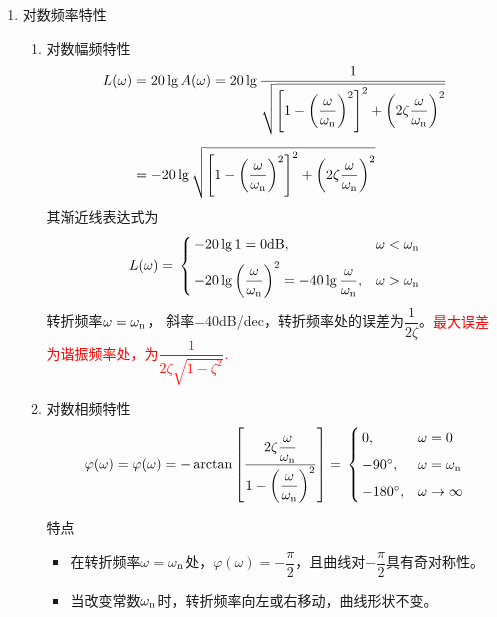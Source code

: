 \begin{enumerate}[1.]
\begin{enumerate}[(1) ]
	\end{enumerate}
	\item 对数频率特性
	\begin{enumerate}[(1) ]
		\item 对数幅频特性
		\vspace*{-0.5em}
		\begin{equation}
			\begin{split}
				L(\omega) & = 20\lg A(\omega) = 20 \lg \dfrac{1}{\sqrt{\left[1 - \left(\dfrac{\omega}{\omega_{\rm{n}}}\right)^2\right]^2 + \left(2 \zeta \dfrac{\omega}{\omega_{\rm{n}}}\right)^2}}\\[0.5em]
				& = -20 \lg \sqrt{\left[1 - \left(\dfrac{\omega}{\omega_{\rm{n}}}\right)^2\right]^2 + \left(2 \zeta \dfrac{\omega}{\omega_{\rm{n}}}\right)^2}
			\end{split}
		\end{equation}
		其渐近线表达式为
		\begin{align}
			L(\omega) = \,
			\begin{cases}
				\, -20 \lg 1 = 0 \text{dB}, & \omega < \omega_{\rm{n}}\\[0.5em]
				\, -20 \lg \left(\dfrac{\omega}{\omega_{\rm{n}}}\right)^2= - 40 \lg \dfrac{\omega}{\omega_{\rm{n}}}, & \omega > \omega_{\rm{n}}
			\end{cases}
		\end{align}
		转折频率$\omega = \omega_{\rm{n}}$， 斜率$-$40dB/dec，转折频率处的误差为$\dfrac{1}{2 \zeta }$。\textcolor{red}{最大误差为谐振频率处，为$ \dfrac{1}{2 \zeta \sqrt{1-\zeta^2}}$.}
		\item 对数相频特性
		\vspace*{-0.5em}
		\begin{align}
			\varphi(\omega) = \varphi(\omega) = -\arctan \left[\dfrac{2 \zeta \dfrac{\omega}{\omega_{\rm{n}}}}{1 - \left(\dfrac{\omega}{\omega_{\rm{n}}}\right)^2}\right] = \,
			\begin{cases}
				\, 0, & \omega = 0\\[0.5em]
				\, -90{}^{\circ} , & \omega = \omega_{\rm{n}}\\[0.5em]
				\, -180 {}^{\circ}, & \omega \to \infty
			\end{cases}
		\end{align}
		\vspace*{-3em}
		
		特点
		\begin{itemize}
			\item 在转折频率$\omega = \omega_{\rm{n}}$处，$\varphi(\omega) =  -\dfrac{\pi}{2}$，且曲线对$-\dfrac{\pi}{2}$具有奇对称性。
			\item 当改变常数$\omega_{\rm{n}}$时，转折频率向左或右移动，曲线形状不变。
		\end{itemize}
	\end{enumerate}
\end{enumerate}

